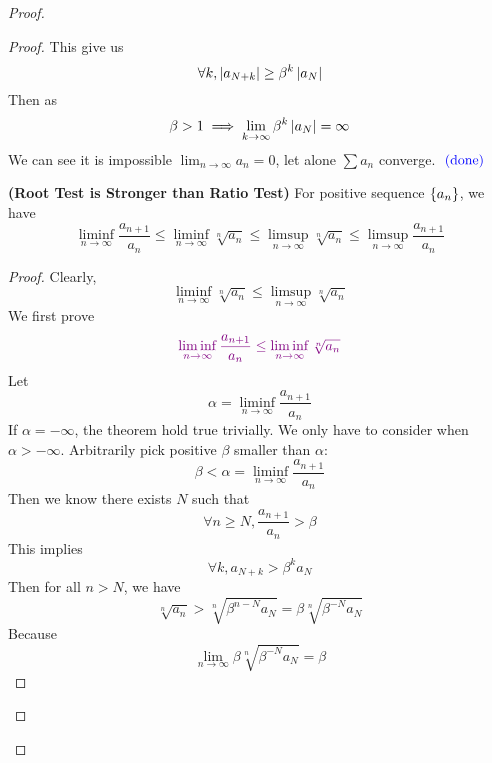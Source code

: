 \documentclass{report}
\begin{document}
\begin{proof}
\begin{proof}
This give us
\begin{equation}
\forall k, \left|a_{N+k}\right|\geq \beta^k \left|a_N\right|
\end{equation}
Then as 
\begin{equation}
\beta >1\implies \lim_{k\to\infty}\beta ^k\left|a_N\right|=\infty
\end{equation}
We can see it is impossible $\lim_{n\to\infty}a_n=0$, let alone $\sum a_n$ converge. $\textcolor{blue}{\text{ (done) }}$
\begin{theorem}
\label{2.5.3}
\textbf{(Root Test is Stronger than Ratio Test)} For positive sequence $\{ a_n \}$, we have
\begin{equation}
\liminf_{n\to\infty}\frac{a_{n+1}}{a_n}\leq \liminf_{n\to\infty} \sqrt[n]{a_n} \leq \limsup_{n\to\infty} \sqrt[n]{a_n} \leq \limsup_{n\to\infty} \frac{a_{n+1}}{a_n}
\end{equation}
\end{theorem}
\begin{proof}
Clearly, 
\begin{equation}
\liminf_{n\to\infty} \sqrt[n]{a_n}\leq \limsup_{n\to\infty} \sqrt[n]{a_n}  
\end{equation}
We first prove
\begin{equation}
  \textcolor{violet}{\liminf_{n\to\infty} \frac{a_{n+1}}{a_n}\leq \liminf_{n\to\infty} \sqrt[n]{a_n}}
\end{equation}
Let 
\begin{equation}
\alpha =\liminf_{n\to\infty} \frac{a_{n+1}}{a_n}
\end{equation}
If $\alpha =-\infty$, the theorem hold true trivially. We only have to consider when $\alpha >-\infty$. Arbitrarily pick positive $\beta $ smaller than $\alpha $:
\begin{equation}
\beta <\alpha=\liminf_{n\to\infty} \frac{a_{n+1}}{a_n}
\end{equation}
Then we know there exists $N$ such that
 \begin{equation}
\forall n\geq N, \frac{a_{n+1}}{a_n}>\beta 
\end{equation}
This implies 
\begin{equation}
\forall k, a_{N+k}>\beta^k a_N
\end{equation}
Then for all $n>N$, we have
 \begin{equation}
   \sqrt[n]{a_n}>\sqrt[n]{ \beta^{n-N}a_{N}}=\beta \sqrt[n]{\beta^{-N}a_N} 
\end{equation}
Because 
\begin{equation}
\lim_{n\to\infty}\beta \sqrt[n]{\beta^{-N}a_N}=\beta 
\end{equation}

\end{proof}
\end{proof}
\end{proof}
\end{document}
